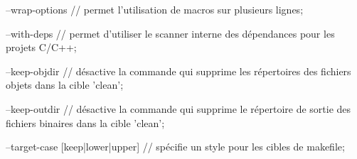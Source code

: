 \begin{code}
    --wrap-options       // permet l'utilisation de macros sur plusieurs lignes;

    --with-deps          // permet d'utiliser le scanner interne des dépendances 
                            pour les projets C/C++;

    --keep-objdir        // désactive la commande qui supprime les répertoires des
                            fichiers objets dans la cible 'clean';

    --keep-outdir        // désactive la commande qui supprime le répertoire de 
                            sortie des fichiers binaires dans la cible 'clean';

    --target-case [keep|lower|upper] // spécifie un style pour les cibles de 
                                        makefile;
\end{code}
